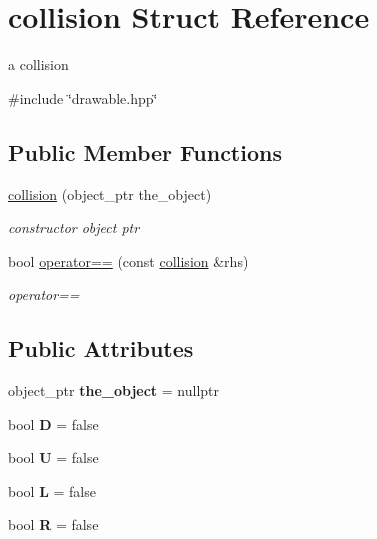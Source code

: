 \hypertarget{structcollision}{}\section{collision Struct Reference}
\label{structcollision}


a collision  




{\ttfamily \#include \char`\"{}drawable.\+hpp\char`\"{}}

\subsection*{Public Member Functions}
\begin{DoxyCompactItemize}
\item 
\hyperlink{structcollision_a8e4d3b4a9355c8946c0ad06ccc6e8d36}{collision} (object\+\_\+ptr the\+\_\+object)
\begin{DoxyCompactList}\small\item\em constructor object ptr \end{DoxyCompactList}\item 
bool \hyperlink{structcollision_ab1721e643a7906b3e4319a86315fce1b}{operator==} (const \hyperlink{structcollision}{collision} \&rhs)
\begin{DoxyCompactList}\small\item\em operator== \end{DoxyCompactList}\end{DoxyCompactItemize}
\subsection*{Public Attributes}
\begin{DoxyCompactItemize}
\item 
\mbox{\label{structcollision_a7ed36890448403a8a50bf90565255e42}} 
object\+\_\+ptr {\bfseries the\+\_\+object} = nullptr
\item 
\mbox{\label{structcollision_a650a2bb40b437483c892b299c21920e8}} 
bool {\bfseries D} = false
\item 
\mbox{\label{structcollision_a01f73e208a2d2c858a157ab895a58509}} 
bool {\bfseries U} = false
\item 
\mbox{\label{structcollision_ae07e40f8555ca518bf68ab3d85fcdb8e}} 
bool {\bfseries L} = false
\item 
\mbox{\label{structcollision_a89956863ae123b47eaf477b785a60a58}} 
bool {\bfseries R} = false
\end{DoxyCompactItemize}



